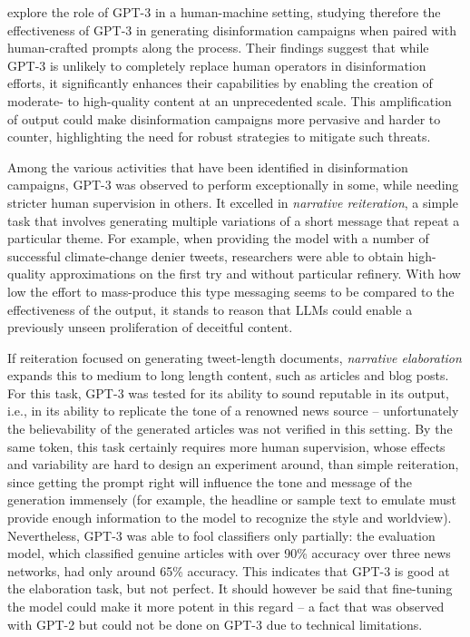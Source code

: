 \citet{buchanan2021truth} explore the role of GPT-3 in a human-machine setting, studying therefore the effectiveness of GPT-3 in generating disinformation campaigns when paired with human-crafted prompts along the process.
Their findings suggest that while GPT-3 is unlikely to completely replace human operators in disinformation efforts, it significantly enhances their capabilities by enabling the creation of moderate- to high-quality content at an unprecedented scale.
This amplification of output could make disinformation campaigns more pervasive and harder to counter, highlighting the need for robust strategies to mitigate such threats.

Among the various activities that have been identified in disinformation campaigns, GPT-3 was observed to perform exceptionally in some, while needing stricter human supervision in others.
It excelled in \emph{narrative reiteration}, a simple task that involves generating multiple variations of a short message that repeat a particular theme.
For example, when providing the model with a number of successful climate-change denier tweets, researchers were able to obtain high-quality approximations on the first try and without particular refinery.
With how low the effort to mass-produce this type messaging seems to be compared to the effectiveness of the output, it stands to reason that LLMs could enable a previously unseen proliferation of deceitful content.

If reiteration focused on generating tweet-length documents, \emph{narrative elaboration} expands this to medium to long length content, such as articles and blog posts.
For this task, GPT-3 was tested for its ability to sound reputable in its output, i.e., in its ability to replicate the tone of a renowned news source -- unfortunately the believability of the generated articles was not verified in this setting.
By the same token, this task certainly requires more human supervision, whose effects and variability are hard to design an experiment around, than simple reiteration, since getting the prompt right will influence the tone and message of the generation immensely (for example, the headline or sample text to emulate must provide enough information to the model to recognize the style and worldview).
Nevertheless, GPT-3 was able to fool classifiers only partially: the evaluation model, which classified genuine articles with over 90\% accuracy over three news networks, had only around 65\% accuracy.
This indicates that GPT-3 is good at the elaboration task, but not perfect.
It should however be said that fine-tuning the model could make it more potent in this regard -- a fact that was observed with GPT-2 but could not be done on GPT-3 due to technical limitations.

